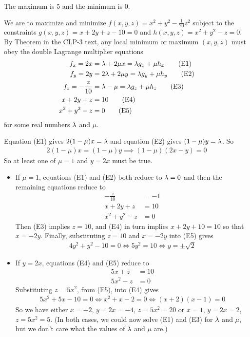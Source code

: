 %

\begin{answer}
The maximum is $5$ and the minimum is $0$.
\end{answer}

\begin{solution}
We are to maximize and minimize $f(x,y,z)=x^2 + y^2 -\frac{1}{20} z^2$ 
subject to the constraints $g(x,y,z)=x + 2y + z - 10=0$ and 
$h(x,y,z) = x^2 + y^2 - z=0$.
By Theorem  in the CLP-3 text, 
any local minimum or maximum $(x,y,z)$ must obey the  double Lagrange 
multiplier equations
\begin{align*}
f_x = 2x &=\lambda + 2 \mu x = \lambda g_x +\mu h_x\tag{E1} \\ 
f_y = 2y &=2\lambda + 2 \mu y = \lambda g_y +\mu h_y\tag{E2} \\ 
f_z = -\frac{z}{10} &=\lambda - \mu  = \lambda g_z +\mu h_z\tag{E3} \\ 
x + 2y + z &= 10\tag{E4} \\
x^2 + y^2 - z &= 0 \tag{E5}
\end{align*}
for some real numbers $\lambda$ and $\mu$.

Equation (E1) gives $2(1-\mu)x=\lambda$ and equation (E2) gives
$(1-\mu)y=\lambda$. So
\begin{align*}
2(1-\mu)x=(1-\mu)y
\implies 
(1-\mu)(2x-y)=0
\end{align*}
So at least one of $\mu=1$ and $y=2x$ must be true.
\begin{itemize}
\item 
If $\mu=1$, equations (E1) and (E2) both reduce to $\lambda=0$
and then the remaining equations reduce to
\begin{align*}
-\frac{z}{10} &=-1\tag{E3} \\ 
x + 2y + z &= 10\tag{E4} \\
x^2 + y^2 - z &= 0 \tag{E5}
\end{align*}
Then (E3) implies $z=10$, and (E4) in turn implies $x+2y+10=10$ so
that $x=-2y$. Finally, substituting $z=10$ and $x=-2y$ into (E5) gives 
\begin{align*}
4y^2+y^2-10=0
\iff 5y^2=10
\iff y=\pm\sqrt{2}
\end{align*}


\item If $y=2x$, equations (E4) and (E5) reduce to
\begin{align*}
5x + z &= 10\tag{E4} \\
5x^2  - z &= 0 \tag{E5}
\end{align*}
Substituting $z=5x^2$, from (E5), into (E4) gives
\begin{align*}
5x^2+5x-10=0
\iff 
x^2+x-2=0
\iff
(x+2)(x-1)=0
\end{align*}
So we have either $x=-2$, $y=2x=-4$, $z=5x^2=20$
               or $x=1$, $y=2x=2$, $z=5x^2=5$. 
(In both cases, we could now solve (E1) and (E3) for $\lambda$ and $\mu$,
but we don't care what the values of $\lambda$ and $\mu$ are.) 


\end{itemize}
\end{solution}
